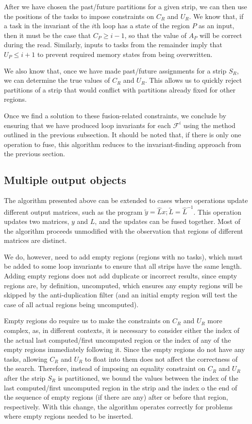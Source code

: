 \documentclass[12pt,letterpaper]{article}
\newcommand*{\opF}{\mathcal{F}}
\begin{document}
After we have chosen the past/future partitions for a given strip, we can then use the positions of the tasks to impose constraints on $C_R$ and $U_R$.
We know that, if a task in the invariant of the $i$th loop has a state of the region $P$ as an input, then it must be the case that $C_P \geq i - 1$, so that the value of $A_P$ will be correct during the read.
Similarly, inputs to tasks from the remainder imply that $U_P \leq i + 1$ to prevent required memory states from being overwritten.

We also know that, once we have made past/future assignments for a strip $S_R$, we can determine the true values of $C_R$ and $U_R$.
This allows us to quickly reject partitions of a strip that would conflict with partitions already fixed for other regions.

Once we find a solution to these fusion-related constraints, we conclude by ensuring that we have produced loop invariants for each $\opF^i$ using the method outlined in the previous subsection.
It should be noted that, if there is only one operation to fuse, this algorithm reduces to the invariant-finding approach from the previous section.

\subsection{Multiple output objects}
The algorithm presented above can be extended to cases where operations update different output matrices, such as the program $\widetilde{y} = \hat{L}x; \widetilde{L} = \hat{L}^{-1}$.
This operation updates two matrices, $y$ and $L$, and the updates can be fused together.
Most of the algorithm proceeds unmodified with the observation that regions of different matrices are distinct.

We do, however, need to add empty regions (regions with no tasks), which must be added to some loop invariants to ensure that all strips have the same length.
Adding empty regions does not add duplicate or incorrect results, since empty regions are, by definition, uncomputed, which ensures any empty regions will be skipped by the anti-duplication filter (and an initial empty region will test the case of all actual regions being uncomputed).

Empty regions do require us to make the constraints on $C_R$ and $U_R$ more complex, as, in different contexts, it is necessary to consider either the index of the actual last computed/first uncomputed region or the index of any of the empty regions immediately following it.
Since the empty regions do not have any tasks, allowing $C_R$ and $U_R$ to float into them does not affect the correctness of the search.
Therefore, instead of imposing an equality constraint on $C_R$ and $U_R$ after the strip $S_R$ is partitioned, we bound the values between the index of the last computed/first uncomputed region in the strip and the index o the end of the sequence of empty regions (if there are any) after or before that region, respectively.
With this change, the algorithm operates correctly for problems where empty regions needed to be inserted.
\end{document}
